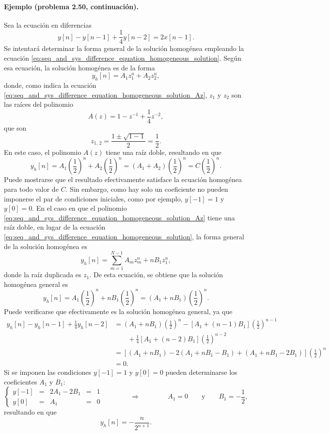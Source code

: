 \documentclass[a4paper]{report}
\begin{document}
\paragraph{Ejemplo (problema 2.50, continuación).} Sea la ecuación en diferencias
\[
 y[n]-y[n-1]+\frac{1}{4}y[n-2]=2x[n-1].
\]
Se intentará determinar la forma general de la solución homogénea empleando la ecuación \ref{eq:seq_and_sys_difference_equation_homogeneous_solution}. Según esa ecuación, la solución homogénea es de la forma
\[
 y_h[n]=A_1z_1^n+A_2z_2^n,
\]
donde, como indica la ecuación \ref{eq:seq_and_sys_difference_equation_homogeneous_solution_Az}, \(z_1\) y \(z_2\) son las raíces del polinomio 
\[
 A(z)=1-z^{-1}+\frac{1}{4}z^{-2},
\]
que son
\[
 z_{1,\,2}=\dfrac{1\pm\sqrt{1-1}}{2}
  =\frac{1}{2}.
\]
En este caso, el polinomio \(A(z)\) tiene una raíz doble, resultando en que 
\[
 y_h[n]=A_1\left(\frac{1}{2}\right)^n+A_2\left(\frac{1}{2}\right)^n=(A_1+A_2)\left(\frac{1}{2}\right)^n
 =C\left(\frac{1}{2}\right)^n.
\]
Puede mostrarse que el resultado efectivamente satisface la ecuación homogénea para todo valor de \(C\). Sin embargo, como hay solo un coeficiente no pueden imponerse el par de condiciones iniciales, como por ejemplo, \(y[-1]=1\) y \(y[0]=0\). En el caso en que el polinomio \ref{eq:seq_and_sys_difference_equation_homogeneous_solution_Az} tiene una raíz doble, en lugar de la ecuación \ref{eq:seq_and_sys_difference_equation_homogeneous_solution}, la forma general de la solución homogénea es
\[
 y_h[n]=\sum_{m=1}^{N-1}A_mz_m^n+nB_1z_1^n,
\]
donde la raíz duplicada es \(z_1\). De esta ecuación, se obtiene que la solución homogénea general es
\[
 y_h[n]=A_1\left(\frac{1}{2}\right)^n+nB_1\left(\frac{1}{2}\right)^n=(A_1+nB_1)\left(\frac{1}{2}\right)^n.
\]
Puede verificarse que efectivamente es la solución homogénea general, ya que 
\begin{align*}
 y_h[n]-y_h[n-1]+\frac{1}{4}y_h[n-2]&=(A_1+nB_1)\left(\frac{1}{2}\right)^n-[A_1+(n-1)B_1]\left(\frac{1}{2}\right)^{n-1}\\
  &\qquad+\frac{1}{4}[A_1+(n-2)B_1]\left(\frac{1}{2}\right)^{n-2}\\
  &=\left[(A_1+nB_1)-2(A_1+nB_1-B_1)+(A_1+nB_1-2B_1)\right]\left(\frac{1}{2}\right)^n\\
  &=0.
\end{align*}
Si se imponen las condiciones \(y[-1]=1\) y \(y[0]=0\) pueden determinarse los coeficientes \(A_1\) y \(B_1\):
\[
 \left\{ 
 \begin{array}{lclclc}
  y[-1] & = & 2A_1-2B_1 & = & 1\\
  y[0] & = & A_1 & = & 0
 \end{array}
 \right.
 \qquad\qquad\Rightarrow\qquad\qquad
 A_1=0
 \qquad\textrm{y}\qquad
 B_1=-\frac{1}{2},
\]
resultando en que 
\[
 y_h[n]=-\frac{n}{2^{n+1}}.
\]
 
\end{document}
